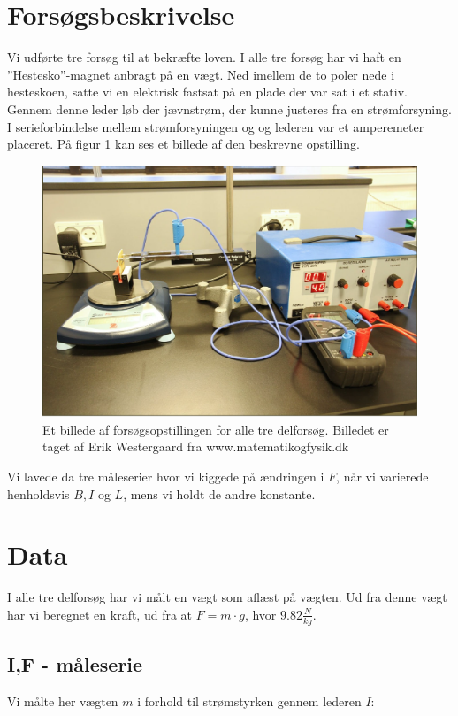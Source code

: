 \documentclass[10pt,a4paper]{article}
\theoremstyle{break}
\theoremstyle{nonumberplain}
\begin{document}
\pagebreak  
\section{Forsøgsbeskrivelse}
Vi udførte tre forsøg til at bekræfte loven. 
I alle tre forsøg har vi haft en ''Hestesko''-magnet anbragt på en vægt. 
Ned imellem de to poler nede i hesteskoen, satte vi en elektrisk fastsat på en plade der var sat i et stativ.
Gennem denne leder løb der jævnstrøm, der kunne justeres fra en strømforsyning. 
I serieforbindelse mellem strømforsyningen og og lederen var et amperemeter placeret.
På figur \ref{opstilling} kan ses et billede af den beskrevne opstilling.	


\begin{figure}[h]
\center
\includegraphics[scale=0.4]{opstilling}
\caption{Et billede af forsøgsopstillingen for alle tre delforsøg. Billedet er taget af Erik Westergaard fra www.matematikogfysik.dk}
\label{opstilling}
\end{figure}

Vi lavede da tre måleserier hvor vi kiggede på ændringen i $F$, når vi varierede henholdsvis $B,I$ og $L$, mens vi holdt de andre konstante. 
\pagebreak
\section{Data}
I alle tre delforsøg har vi målt en vægt som aflæst på vægten. 
Ud fra denne vægt har vi beregnet en kraft, ud fra at $F = m \cdot g$, hvor $9.82 \frac{N}{kg}$.
\subsection{I,F - måleserie}
Vi målte her vægten $m$ i forhold til strømstyrken gennem lederen $I$:
\end{document}
